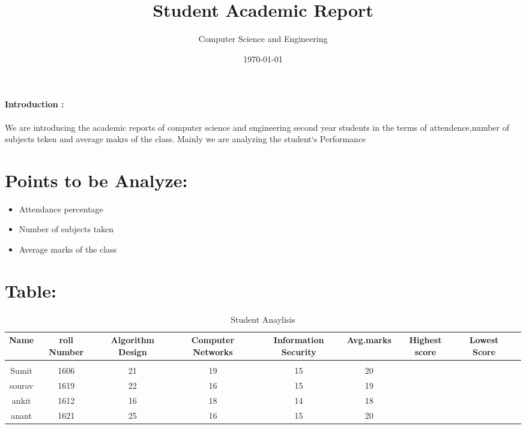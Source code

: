 \documentclass{article}
\title{\textbf{Student Academic Report}}
\author{Computer Science and Engineering}
\date{\today}
\begin{document}
\maketitle
\paragraph{Introduction :}
We are introducing the academic reports of computer science and engineering second year students in the terms of attendence,number of subjects teken and average makrs of the class. Mainly we are analyzing the student`s Performance 
\section{Points to be Analyze:}
\begin{itemize}
    \item Attendance percentage
    \item Number of subjects taken
    \item Average marks of the class
\end{itemize}
\section{Table:}
\begin{table}[h]
    \centering
    \begin{tabular}{|c|c|c|c|c|C|c|c|c|}
    \hline
        Name & roll Number & Algorithm Design & Computer Networks &Information Security& Avg.marks & Highest score & Lowest Score  \\
          \hline \\
        Sumit &1606 &21&19&15&20 \\
          sourav &1619 &22&16&15 &19  \\
        ankit &1612 &16&18&14 &18  \\
        anant &1621 &25&16&15 &20  \\
        \hline
    \end{tabular}
    \caption{Student Anaylisis}
    \label{tab:my_label}
\end{table}
\end{document}
